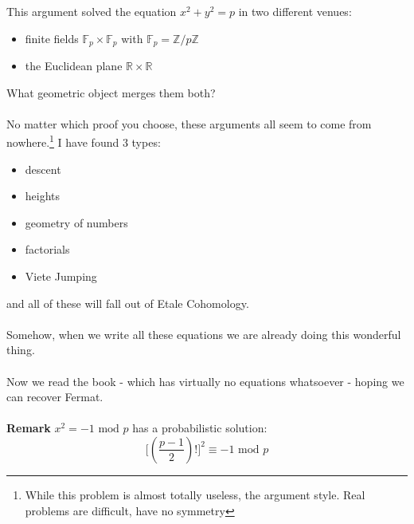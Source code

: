 \documentclass[12pt]{article}
\begin{document}
\noindent This argument solved the equation $x^2 + y^2 = p$ in two different venues:
\begin{itemize}
\item finite fields $\mathbb{F}_p \times \mathbb{F}_p$ with $\mathbb{F}_p= \mathbb{Z}/p\mathbb{Z}$
\item the Euclidean plane $\mathbb{R} \times \mathbb{R}$
\end{itemize}
What geometric object merges them both? \\ \\
No matter which proof you choose, these arguments all seem to come from nowhere.\footnote{While this problem is almost totally useless, the argument style.  Real problems are difficult, have no symmetry}  I have found 3 types:
\begin{itemize}
\item descent
\item heights
\item geometry of numbers
\item factorials
\item Viete Jumping
\end{itemize}
and all of these will fall out of Etale Cohomology.  \\ \\
Somehow, when we write all these equations we are already doing this wonderful thing. \\ \\ Now we read the book - which has virtually no equations whatsoever - hoping we can recover Fermat. \\ \\
\textbf{Remark} $x^2 = -1 \text{ mod }p$ has a probabilistic solution:
$$ \big[(\frac{p-1}{2})! \big]^2 \equiv -1 \text{ mod }p $$

\newpage
\end{document}
